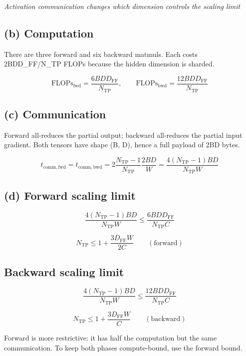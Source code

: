 \documentclass[10pt,a4paper]{article}
\begin{document}
\textit{Activation communication changes which dimension controls the scaling limit}\par

\subsection*{(b) Computation}

There are three forward and six backward matmuls. Each costs 2BDD\_FF/N\_TP FLOPs because the hidden dimension is sharded.\par

\[\boxed{\mathrm{FLOPs}_{\mathrm{fwd}}=\frac{6BDD_{\mathrm{FF}}}{N_{\mathrm{TP}}},\qquad \mathrm{FLOPs}_{\mathrm{bwd}}=\frac{12BDD_{\mathrm{FF}}}{N_{\mathrm{TP}}}}\]

\subsection*{(c) Communication}

Forward all-reduces the partial output; backward all-reduces the partial input gradient. Both tensors have shape (B, D), hence a full payload of 2BD bytes.\par

\[\boxed{t_{\mathrm{comm,fwd}}=t_{\mathrm{comm,bwd}}=2\frac{N_{\mathrm{TP}}-1}{N_{\mathrm{TP}}}\frac{2BD}{W}=\frac{4(N_{\mathrm{TP}}-1)BD}{N_{\mathrm{TP}}W}}\]

\subsection*{(d) Forward scaling limit}

\[\frac{4(N_{\mathrm{TP}}-1)BD}{N_{\mathrm{TP}}W}\leq\frac{6BDD_{\mathrm{FF}}}{N_{\mathrm{TP}}C}\]

\[\boxed{N_{\mathrm{TP}}\leq 1+\frac{3D_{\mathrm{FF}}W}{2C}\qquad(\mathrm{forward})}\]

\subsection*{Backward scaling limit}

\[\frac{4(N_{\mathrm{TP}}-1)BD}{N_{\mathrm{TP}}W}\leq\frac{12BDD_{\mathrm{FF}}}{N_{\mathrm{TP}}C}\]

\[\boxed{N_{\mathrm{TP}}\leq 1+\frac{3D_{\mathrm{FF}}W}{C}\qquad(\mathrm{backward})}\]

Forward is more restrictive: it has half the computation but the same communication. To keep both phases compute-bound, use the forward bound.\par
\end{document}
